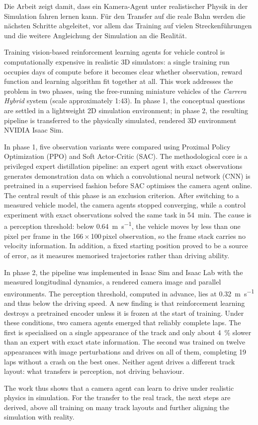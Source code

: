 Die Arbeit zeigt damit, dass ein Kamera-Agent unter realistischer Physik in der Simulation fahren lernen kann. Für den Transfer auf die reale Bahn werden die nächsten Schritte abgeleitet, vor allem das Training auf vielen Streckenführungen und die weitere Angleichung der Simulation an die Realität.

\clearpage


Training vision-based reinforcement learning agents for vehicle control is computationally expensive in realistic 3D simulators: a single training run occupies days of compute before it becomes clear whether observation, reward function and learning algorithm fit together at all. This work addresses the problem in two phases, using the free-running miniature vehicles of the \textit{Carrera Hybrid} system (scale approximately 1:43). In phase 1, the conceptual questions are settled in a lightweight 2D simulation environment; in phase 2, the resulting pipeline is transferred to the physically simulated, rendered 3D environment NVIDIA Isaac Sim.

In phase 1, five observation variants were compared using Proximal Policy Optimization (\ac{PPO}) and Soft Actor-Critic (\ac{SAC}). The methodological core is a privileged expert distillation pipeline: an expert agent with exact observations generates demonstration data on which a convolutional neural network (\ac{CNN}) is pretrained in a supervised fashion before SAC optimises the camera agent online. The central result of this phase is an exclusion criterion. After switching to a measured vehicle model, the camera agents stopped converging, while a control experiment with exact observations solved the same task in \SI{54}{\minute}. The cause is a perception threshold: below \SI{0.64}{\meter\per\second}, the vehicle moves by less than one pixel per frame in the \num{166}\,$\times$\,\num{100}\,pixel observation, so the frame stack carries no velocity information. In addition, a fixed starting position proved to be a source of error, as it measures memorised trajectories rather than driving ability.

In phase 2, the pipeline was implemented in Isaac Sim and Isaac Lab with the measured longitudinal dynamics, a rendered camera image and parallel environments. The perception threshold, computed in advance, lies at \SI{0.32}{\meter\per\second} and thus below the driving speed. A new finding is that reinforcement learning destroys a pretrained encoder unless it is frozen at the start of training. Under these conditions, two camera agents emerged that reliably complete laps. The first is specialised on a single appearance of the track and only about \SI{4}{\percent} slower than an expert with exact state information. The second was trained on twelve appearances with image perturbations and drives on all of them, completing 19 laps without a crash on the best ones. Neither agent drives a different track layout: what transfers is perception, not driving behaviour.

The work thus shows that a camera agent can learn to drive under realistic physics in simulation. For the transfer to the real track, the next steps are derived, above all training on many track layouts and further aligning the simulation with reality.

\clearpage
